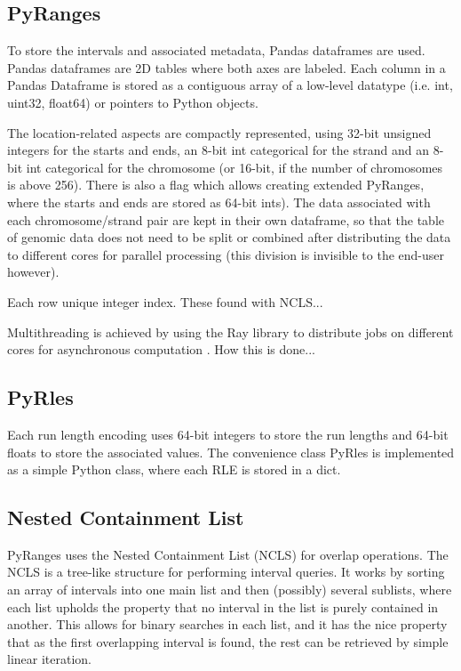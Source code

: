 \documentclass[10pt,letterpaper]{article}
\begin{document}
\subsection*{PyRanges}

To store the intervals and associated metadata, Pandas dataframes are used.
Pandas dataframes are 2D tables where both axes are labeled. Each column in a
Pandas Dataframe is stored as a contiguous array of a low-level datatype (i.e.
int, uint32, float64) or pointers to Python objects.

The location-related aspects are compactly represented, using 32-bit unsigned
integers for the starts and ends, an 8-bit int categorical for the strand and an
8-bit int categorical for the chromosome (or 16-bit, if the number of
chromosomes is above 256). There is also a flag which allows creating extended
PyRanges, where the starts and ends are stored as 64-bit ints). The data
associated with each chromosome/strand pair are kept in their own dataframe, so
that the table of genomic data does not need to be split or combined after
distributing the data to different cores for parallel processing (this division
is invisible to the end-user however).

Each row unique integer index. These found with NCLS...

Multithreading is achieved by using the Ray library to distribute jobs on
different cores for asynchronous computation \cite{}. How this is done...

\subsection*{PyRles}

Each run length encoding uses 64-bit integers to store the run lengths and
64-bit floats to store the associated values. The convenience class PyRles is
implemented as a simple Python class, where each RLE is stored in a dict.

\subsection*{Nested Containment List}

PyRanges uses the Nested Containment
List\cite{doi:10.1093/bioinformatics/btl647} (NCLS) for overlap operations. The
NCLS is a tree-like structure for performing interval queries. It works by
sorting an array of intervals into one main list and then (possibly) several
sublists, where each list upholds the property that no interval in the list is
purely contained in another. This allows for binary searches in each list, and
it has the nice property that as the first overlapping interval is found, the
rest can be retrieved by simple linear iteration.
\end{document}
